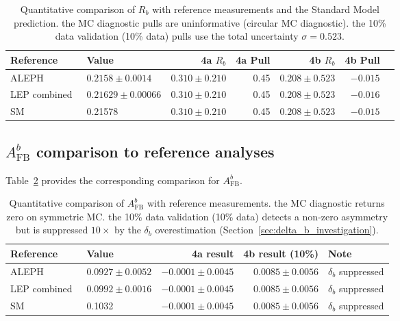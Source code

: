 \documentclass[11pt,a4paper]{article}
\begin{document}
\begin{table}[htbp]
\centering
\caption{Quantitative comparison of $R_b$ with reference measurements
and the Standard Model prediction. the MC diagnostic pulls are uninformative (circular MC
diagnostic). the 10\% data validation (10\% data) pulls use the total uncertainty $\sigma = 0.523$.}
\label{tab:rb_comparison}
\begin{tabular}{llrrrrr}
\toprule
Reference & Value & 4a $R_b$ & 4a Pull & 4b $R_b$ & 4b Pull \\
\midrule
ALEPH~\cite{ALEPH:Rb:1996} & $0.2158 \pm 0.0014$ & $0.310 \pm 0.210$ & 0.45 & $0.208 \pm 0.523$ & $-0.015$ \\
LEP combined~\cite{LEP:EWWG:2005} & $0.21629 \pm 0.00066$ & $0.310 \pm 0.210$ & 0.45 & $0.208 \pm 0.523$ & $-0.016$ \\
SM~\cite{LEP:EWWG:2005} & 0.21578 & $0.310 \pm 0.210$ & 0.45 & $0.208 \pm 0.523$ & $-0.015$ \\
\bottomrule
\end{tabular}
\end{table}

\subsection{$A_\mathrm{FB}^b$ comparison to reference analyses}
\label{sec:afb_comparison_detail}

Table~\ref{tab:afb_comparison} provides the corresponding comparison for $A_\mathrm{FB}^b$.

\begin{table}[htbp]
\centering
\caption{Quantitative comparison of $A_\mathrm{FB}^b$ with reference measurements.
the MC diagnostic returns zero on symmetric MC. the 10\% data validation (10\% data) detects a non-zero
asymmetry but is suppressed $10\times$ by the $\delta_b$ overestimation
(Section~\ref{sec:delta_b_investigation}).}
\label{tab:afb_comparison}
\begin{tabular}{llrrl}
\toprule
Reference & Value & 4a result & 4b result (10\%) & Note \\
\midrule
ALEPH~\cite{ALEPH:AFBb} & $0.0927 \pm 0.0052$ & $-0.0001 \pm 0.0045$ & $0.0085 \pm 0.0056$ & $\delta_b$ suppressed \\
LEP combined~\cite{LEP:EWWG:2005} & $0.0992 \pm 0.0016$ & $-0.0001 \pm 0.0045$ & $0.0085 \pm 0.0056$ & $\delta_b$ suppressed \\
SM~\cite{LEP:EWWG:2005} & 0.1032 & $-0.0001 \pm 0.0045$ & $0.0085 \pm 0.0056$ & $\delta_b$ suppressed \\
\bottomrule
\end{tabular}
\end{table}
\end{document}
